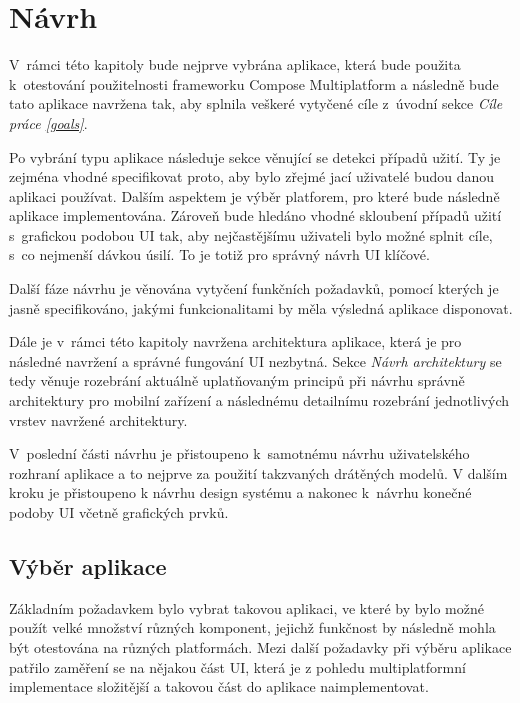 \chapter{Návrh}
V~rámci této kapitoly bude nejprve vybrána aplikace, která bude použita k~otestování použitelnosti frameworku Compose Multiplatform a následně
bude tato aplikace navržena tak, aby splnila veškeré vytyčené cíle z~úvodní sekce \textit{Cíle práce \ref{goals}}.

Po vybrání typu aplikace následuje sekce věnující se detekci případů užití. Ty je zejména vhodné specifikovat proto, aby bylo zřejmé jací 
uživatelé budou danou aplikaci používat. Dalším aspektem je výběr platforem, pro které bude následně aplikace implementována. %
Zároveň bude hledáno vhodné skloubení případů užití s~grafickou podobou UI tak, aby nejčastějšímu uživateli bylo možné splnit cíle, s~co nejmenší dávkou úsilí. 
To je totiž pro správný návrh UI klíčové. 

Další fáze návrhu je věnována vytyčení funkčních požadavků, pomocí kterých je jasně specifikováno, jakými funkcionalitami by měla výsledná 
aplikace disponovat. 

Dále je v~rámci této kapitoly navržena architektura aplikace, která je pro následné navržení a správné fungování UI nezbytná. Sekce \textit{Návrh architektury} se tedy věnuje rozebrání aktuálně uplatňovaným principů při návrhu správně architektury pro mobilní zařízení a následnému detailnímu
rozebrání jednotlivých vrstev navržené architektury.

V~poslední části návrhu je přistoupeno k~samotnému návrhu uživatelského rozhraní aplikace a to nejprve za použití takzvaných drátěných modelů. V dalším kroku je přistoupeno k návrhu design systému a nakonec k~návrhu konečné podoby UI včetně grafických prvků.


\section{Výběr aplikace}
Základním požadavkem bylo vybrat takovou aplikaci, ve které by bylo možné použít velké množství různých komponent, jejichž funkčnost by následně mohla být otestována
na různých platformách.
Mezi další požadavky při výběru aplikace patřilo zaměření se na nějakou část UI, která je z pohledu multiplatformní implementace složitější a takovou část do aplikace naimplementovat.

